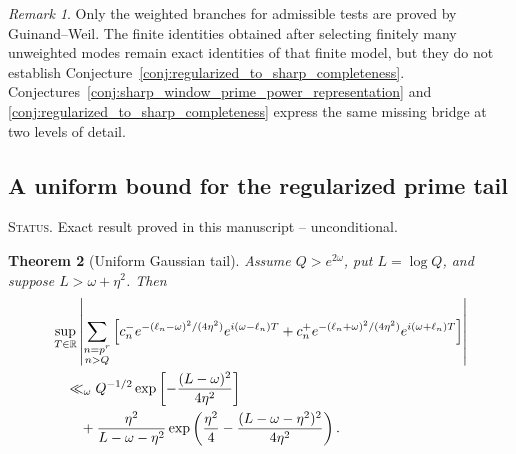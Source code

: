\documentclass[11pt]{amsart}
\numberwithin{equation}{section}
\theoremstyle{plain}
\newtheorem{theorem}{Theorem}[section]
\theoremstyle{definition}
\theoremstyle{remark}
\newtheorem{remark}[theorem]{Remark}
\newcommand{\1}{\mathbf{1}}
\newcommand{\statusnote}[1]{%
  \par\smallskip\noindent
  \begingroup\footnotesize\textsc{Status.} #1\endgroup
  \par\smallskip}
\begin{document}
\begin{remark}
\label{rem:regularized_exact_sharp_conjecture}
Only the weighted branches for admissible tests are proved by
Guinand--Weil.  The finite identities obtained after selecting finitely many
unweighted modes remain exact identities of that finite model, but they do
not establish Conjecture~\ref{conj:regularized_to_sharp_completeness}.
Conjectures~\ref{conj:sharp_window_prime_power_representation} and
\ref{conj:regularized_to_sharp_completeness} express the same missing bridge
at two levels of detail.
\end{remark}

\subsection{A uniform bound for the regularized prime tail}
\label{subsec:regularized_tail_bound}

\statusnote{Exact result proved in this manuscript -- unconditional.}
\begin{theorem}[Uniform Gaussian tail]
\label{thm:uniform_gaussian_tail}
Assume \(Q>e^{2\omega}\), put \(L=\log Q\), and suppose
\(L>\omega+\eta^2\).  Then
\begin{align}
&\sup_{T\in\mathbb R}
\left|
\sum_{\substack{n=p^r\\n>Q}}
\left[
 c_n^-e^{-(\ell_n-\omega)^2/(4\eta^2)}e^{i(\omega-\ell_n)T}
+c_n^+e^{-(\ell_n+\omega)^2/(4\eta^2)}e^{i(\omega+\ell_n)T}
\right]
\right|
\notag
\\
&\quad\ll_\omega
Q^{-1/2}
\exp\left[-\frac{(L-\omega)^2}{4\eta^2}\right]
\label{eq:uniform_gaussian_tail_endpoint}
\\
&\qquad+
\frac{\eta^2}{L-\omega-\eta^2}
\exp\left(
\frac{\eta^2}{4}
-
\frac{(L-\omega-\eta^2)^2}{4\eta^2}
\right).
\label{eq:uniform_gaussian_tail}
\end{align}
\end{theorem}
\end{document}
